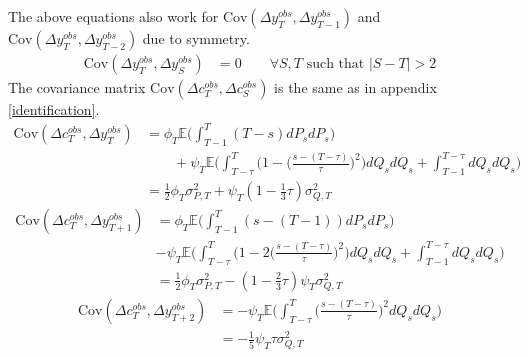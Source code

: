 The above equations also work for $\mathrm{Cov}(\Delta y^{obs}_T, \Delta y^{obs}_{T-1})$ and $\mathrm{Cov}(\Delta y^{obs}_T, \Delta y^{obs}_{T-2})$ due to symmetry.
\begin{align*}
\mathrm{Cov}(\Delta y^{obs}_T, \Delta y^{obs}_{S}) &= 0 \qquad \forall S,T \text{ such that }|S-T| >2 
\end{align*}
The covariance matrix $\mathrm{Cov}(\Delta c^{obs}_T, \Delta c^{obs}_{S})$ is the same as in appendix \ref{identification}.
\begin{align*}
\mathrm{Cov}(\Delta c^{obs}_T, \Delta y^{obs}_T) &= \phi_T \mathbb{E} \Big(  \int_{T-1}^{T} (T-s) dP_s dP_s \Big) \nonumber \\
& \qquad +  \psi_T \mathbb{E} \Big(\int_{T-\tau}^{T} \Big( 1 - \Big(\frac{s-(T-\tau)}{\tau}\Big)^2\Big) dQ_s dQ_s  + \int_{T-1}^{T-\tau} dQ_s dQ_s\Big) \nonumber \\
&= \frac{1}{2} \phi_T \sigma^2_{P,T} + \psi_T  (1-\frac{1}{3}\tau )\sigma^2_{Q,T} 
\end{align*}
\begin{align*}
\mathrm{Cov}(\Delta c^{obs}_T, \Delta y^{obs}_{T+1}) &=  \phi_T \mathbb{E} \Big(  \int_{T-1}^{T} (s-(T-1)) dP_s dP_s \Big) \nonumber \\
&  -\psi_T \mathbb{E} \Big(  \int_{T-\tau}^{T}\Big( 1 - 2\Big(\frac{s-(T-\tau)}{\tau}\Big)^2\Big)  dQ_s dQ_s + \int_{T-1}^{T-\tau}  dQ_s dQ_s \Big) \nonumber \\
&= \frac{1}{2} \phi_T \sigma^2_{P,T} - (1-\frac{2}{3}\tau) \psi_T \sigma^2_{Q,T} 
\end{align*}
\begin{align*}
\mathrm{Cov}(\Delta c^{obs}_T, \Delta y^{obs}_{T+2}) &=  -\psi_T \mathbb{E} \Big(  \int_{T-\tau}^{T} \Big(\frac{s-(T-\tau)}{\tau}\Big)^2 dQ_s dQ_s\Big) \nonumber \\
&= -\frac{1}{5}\psi_T  \tau \sigma^2_{Q,T}
\end{align*}

